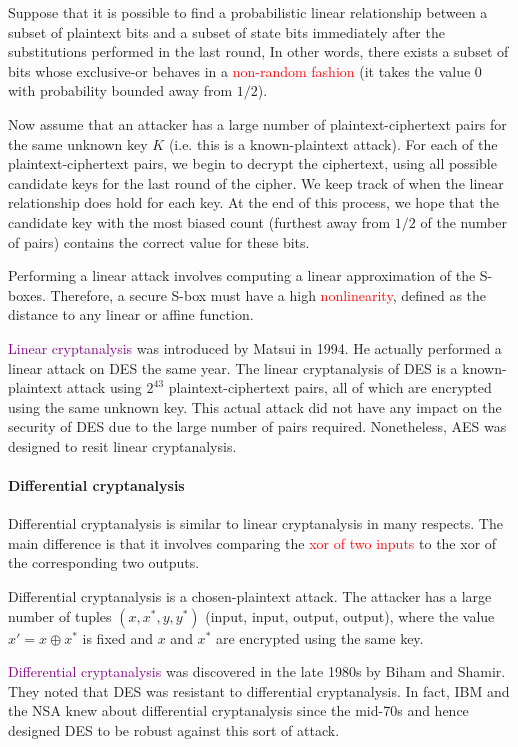 \documentclass[a4paper, 11pt, openany]{book}
\numberwithin{equation}{section}
\theoremstyle{plain}
\theoremstyle{definition}
\newcommand{\Important}[1]{\textcolor{red}{#1}}
\newcommand{\Define}[1]{\textcolor{purple}{#1}}
\begin{document}
Suppose that it is possible to find a probabilistic linear relationship between a subset of plaintext bits and a subset of state bits immediately after the substitutions performed in the last round, In other words, there exists a subset of bits whose exclusive-or behaves in a \Important{non-random fashion} (it takes the value $0$ with probability bounded away from $1/2$).

Now assume that an attacker has a large number of plaintext-ciphertext pairs for the same unknown key $K$ (i.e. this is a known-plaintext attack). For each of the plaintext-ciphertext pairs, we begin to decrypt the ciphertext, using all possible candidate keys for the last round of the cipher. We keep track of when the linear relationship does hold for each key. At the end of this process, we hope that the candidate key with the most biased count (furthest away from $1/2$ of the number of pairs) contains the correct value for these bits.

Performing a linear attack involves computing a linear approximation of the S-boxes. Therefore, a secure S-box must have a high \Important{nonlinearity}, defined as the distance to any linear or affine function.

\Define{Linear cryptanalysis} was introduced by Matsui in 1994. He actually performed a linear attack on DES the same year. The linear cryptanalysis of DES is a known-plaintext attack using $2^{43}$ plaintext-ciphertext pairs, all of which are encrypted using the same unknown key. This actual attack did not have any impact on the security of DES due to the large number of pairs required. Nonetheless, AES was designed to resit linear cryptanalysis.


\paragraph{Differential cryptanalysis}
Differential cryptanalysis is similar to linear cryptanalysis in many respects. The main difference is that it involves comparing the \Important{xor of two inputs} to the xor of the corresponding two outputs. 

Differential cryptanalysis is a chosen-plaintext attack. The attacker has a large number of tuples $(x, x^*, y, y^*)$ (input, input, output, output), where the value $x' = x \oplus x^*$ is fixed and $x$ and $x^*$ are encrypted using the same key.

\Define{Differential cryptanalysis} was discovered in the late 1980s by Biham and Shamir. They noted that DES was resistant to differential cryptanalysis. In fact, IBM and the NSA knew about differential cryptanalysis since the mid-70s and hence designed DES to be robust against this sort of attack.
\end{document}
